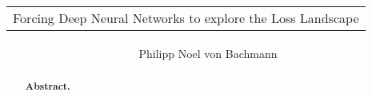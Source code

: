 \documentclass[
a4paper, 12pt, %
titlepage, 		 %
twoside,			 %
headsepline,	 %
BCOR5mm,			 %
idxtotoc, bibtotoc]{scrreprt}	%
\title{\begin{tabular}{p{11cm}}\centering\Large
Forcing Deep Neural Networks to explore the Loss Landscape
\end{tabular}}
\author{\large Philipp Noel von Bachmann}
\date{} %
\begin{document}

\maketitle

\begin{abstract}
\textbf{Abstract. }
\end{abstract}





\tableofcontents		%
\cleardoublepage		%













%

%




% 
\end{document}

